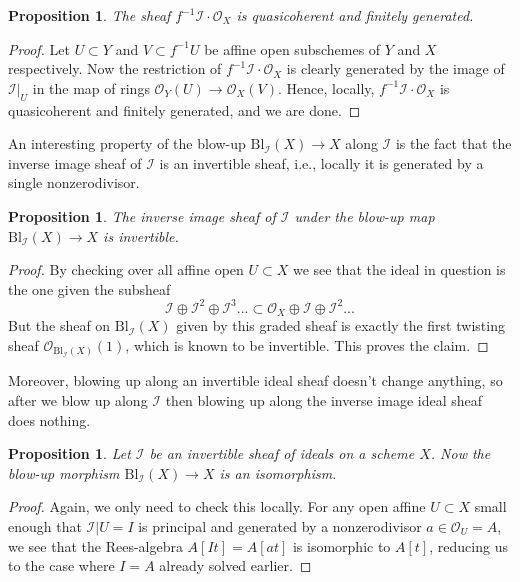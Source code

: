 \documentclass[12pt,a4paper,leqno]{article}
\newcommand{\OO}{\mathcal{O}}
\newcommand{\bl}{\mathrm{Bl}}
\theoremstyle{plain}
\newtheorem{prop}[theo]{Proposition}
\theoremstyle{definition}
\theoremstyle{remark}
\begin{document}
\begin{prop}
The sheaf $f^{-1} \mathscr{I} \cdot \OO_X$ is quasicoherent and finitely generated.
\end{prop}
\begin{proof}
Let $U \subset Y$ and $V \subset f^{-1}U$ be affine open subschemes of $Y$ and $X$ respectively. Now the restriction of $f^{-1} \mathscr{I} \cdot \OO_X$ is clearly generated by the image of $\mathscr{I}|_U$ in the map of rings $\OO_Y (U) \to \OO_X (V)$. Hence, locally, $f^{-1} \mathscr{I} \cdot \OO_X$ is quasicoherent and finitely generated, and we are done.
\end{proof}

An interesting property of the blow-up $\bl_\mathscr{I} (X) \to X$ along $\mathscr{I}$ is the fact that the inverse image sheaf of $\mathscr{I}$ is an invertible sheaf, i.e., locally it is generated by a single nonzerodivisor.

\begin{prop}
The inverse image sheaf of $\mathscr{I}$ under the blow-up map $\bl_\mathscr{I} (X) \to X$ is invertible.
\end{prop}
\begin{proof}
By checking over all affine open $U \subset X$ we see that the ideal in question is the one given the subsheaf 
\begin{equation*}
\mathscr{I} \oplus \mathscr{I}^2 \oplus \mathscr{I}^3 ... \subset \OO_X \oplus \mathscr{I} \oplus \mathscr{I}^2 ... 
\end{equation*}
But the sheaf on $\bl_\mathscr{I} (X)$ given by this graded sheaf is exactly the first twisting sheaf $\OO_{\bl_\mathscr{I} (X)}(1)$, which is known to be invertible. This proves the claim.
\end{proof}

Moreover, blowing up along an invertible ideal sheaf doesn't change anything, so after we blow up along $\mathscr{I}$ then blowing up along the inverse image ideal sheaf does nothing.

\begin{prop}
Let $\mathscr{I}$ be an invertible sheaf of ideals on a scheme $X$. Now the blow-up morphism $\bl_{\mathscr{I}} (X) \to X$ is an isomorphism.
\end{prop}
\begin{proof}
Again, we only need to check this locally. For any open affine $U \subset X$ small enough that $\mathscr{I}|U = I$ is principal and generated by a nonzerodivisor $a \in \OO_U = A$, we see that the Rees-algebra $A[It] = A[at]$ is isomorphic to $A[t]$, reducing us to the case where $I=A$ already solved earlier.   
\end{proof}
\end{document}
